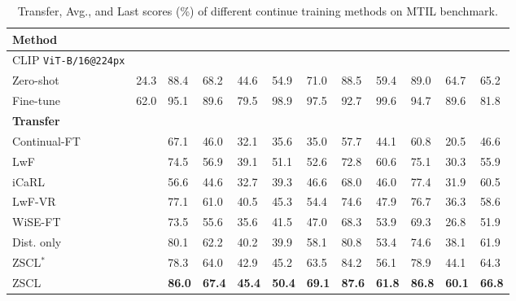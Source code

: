 \begin{table}[t]
\centering
\caption{Transfer, Avg., and Last scores (\%) of different continue training methods on MTIL benchmark.}
\label{tab:finalacc}
{
\footnotesize
\begin{tabular}{y{120}*{11}{x{18}}}
\toprule
Method &  &  &  &  &  &  &  &  &  &  &  \\ \midrule

CLIP \texttt{ViT-B/16@224px} &  &  &  &  &  &  &  &  &  &  & \\
\quad Zero-shot & 24.3 & 88.4 & 68.2 & 44.6 & 54.9 & 71.0 & 88.5 & 59.4 & 89.0 & 64.7 & 65.2 \\
\quad Fine-tune & 62.0 & 95.1 & 89.6 & 79.5 & 98.9 & 97.5 & 92.7 & 99.6 & 94.7 & 89.6 & 81.8 \\ \midrule
\midrule

\quad \textbf{Transfer} \\
\quad \quad Continual-FT & &  67.1 & 46.0 & 32.1 & 35.6 & 35.0 & 57.7 & 44.1 & 60.8 & 20.5 & 46.6 \\
\quad \quad LwF~\cite{li2017learning} & & 74.5 & 56.9 & 39.1 & 51.1 & 52.6 & 72.8 & 60.6 & 75.1 & 30.3 & 55.9 \\
\quad \quad iCaRL~\cite{rebuffi2017icarl} & & 56.6 & 44.6 & 32.7 & 39.3 & 46.6 & 68.0 & 46.0 & 77.4 & 31.9 & 60.5\\
\quad \quad LwF-VR~\cite{ding2022don} & & 77.1 & 61.0 & 40.5 & 45.3 & 54.4 & 74.6 & 47.9 & 76.7 & 36.3 & 58.6 \\
\quad \quad WiSE-FT~\cite{wortsman2022robust} & & 73.5 & 55.6 & 35.6 & 41.5 & 47.0 & 68.3 & 53.9 & 69.3 & 26.8 & 51.9  \\
\quad \quad Dist. only & & 80.1 & 62.2 & 40.2 & 39.9 & 58.1 & 80.8 & 53.4 & 74.6 & 38.1 & 61.9 \\ 
\quad \quad ZSCL$^*$ & & 78.3 & 64.0 & 42.9 & 45.2 & 63.5 & 84.2 & 56.1 & 78.9 & 44.1 & 64.3 \\
\quad \quad ZSCL & & \textbf{86.0} & \textbf{67.4} & \textbf{45.4} & \textbf{50.4} & \textbf{69.1} & \textbf{87.6} & \textbf{61.8} & \textbf{86.8} & \textbf{60.1} & \textbf{66.8} \\ \midrule


\end{tabular}}
\end{table}
